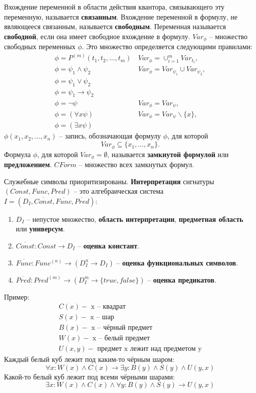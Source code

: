 \documentclass[11pt]{article}
\newcounter{th}\setcounter{th}{0}
\begin{document}
Вхождение переменной в области действия квантора, связывающего эту переменную, называется \textbf{связанным}. Вхождение переменной в формулу, не являющееся связанным, называется \textbf{свободным}. Переменная называется \textbf{свободной}, если она имеет свободное вхождение в формулу. \(Var_{\phi}\) -- множество свободных переменных \(\phi\). Это множество определяется следующими правилами:
\begin{align*}
\phi = P^{(m)}(t_1, t_2, \ldots, t_m) &\, Var_{\phi} = \cup_{i = 1}^mVar_{t_i}, \\
\phi = \psi_1 \land \psi_2 &\, Var_{\phi} = Var_{\psi_1} \cup Var_{\psi_2}, \\
\phi = \psi_1 \lor \psi_2 \\
\phi = \psi_1 \to \psi_2 \\
\phi = \neg \psi &\, Var_{\phi} = Var_{\psi}, \\
\phi = (\forall x \psi) &\, Var_{\phi} = Var_{\psi} \backslash \{x\}, \\
\phi = (\exists x \psi)
\end{align*}
\(\phi(x_1, x_2, \ldots, x_n)\) -- запись, обозначающая формулу \(\phi\), для которой
\begin{equation*}
Var_{\phi} \subseteq \{x_1, \ldots, x_n\}.
\end{equation*}
Формула $\phi$, для которой $Var_{\phi} = \emptyset$, называется \textbf{замкнутой формулой} или \textbf{предложением}. $CForm$ -- множество всех замкнутых формул.

Служебные символы приоритизированы.
\textbf{Интерпретация} сигнатуры \((Const, Func, Pred)\) -- это алгебраическая система \(I = (D_I, \overline{Const}, \overline{Func}, \overline{Pred})\):
\begin{enumerate}
\item \(D_I\) -- непустое множество, \textbf{область интерпретации}, \textbf{предметная область} или \textbf{универсум}.
\item \(\overline{Const}: Const \to D_I\) -- \textbf{оценка констант}.
\item \(\overline{Func}: Func^{(n)} \to (D_I^n \to D_I)\) -- \textbf{оценка функциональных символов}.
\item \(\overline{Pred}: Pred^{(m)} \to (D_I^m \to \{true, false\})\) -- \textbf{оценка предикатов}.
\end{enumerate}
Пример:
\begin{gather*}
C(x) - \text{ x -- квадрат} \\
S(x) - \text{ x -- шар} \\
B(x) - \text{ x -- чёрный предмет} \\
W(x) - \text{ x -- белый предмет} \\
U(x, y) - \text{ предмет x лежит над предметом y}
\end{gather*}
Каждый белый куб лежит под каким-то чёрным шаром:
\begin{equation*}
\forall x: W(x) \land C(x) \to \exists y: B(y) \land S(y) \land U(y, x)
\end{equation*}
Какой-то белый куб лежит под всеми чёрными шарами:
\begin{equation*}
\exists x: W(x) \land C(x) \land \forall y: B(y) \land S(y) \to U(y, x)
\end{equation*}
\end{document}
